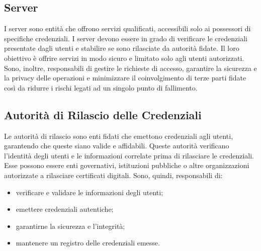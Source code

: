     \subsection{Server}
        I server sono entità che offrono servizi qualificati, accessibili solo ai possessori di specifiche credenziali.
        I server devono essere in grado di verificare le credenziali presentate dagli utenti e stabilire se sono rilasciate da autorità fidate.
        Il loro obiettivo è offrire servizi in modo sicuro e limitato solo agli utenti autorizzati.
        Sono, inoltre, responsabili di gestire le richieste di accesso, garantire la sicurezza e la privacy delle operazioni e minimizzare il coinvolgimento di terze parti fidate così da ridurre i rischi legati ad un singolo punto di fallimento.

        
    \subsection{Autorità di Rilascio delle Credenziali}
        Le autorità di rilascio sono enti fidati che emettono credenziali agli utenti, garantendo che queste siano valide e affidabili.
        Queste autorità verificano l'identità degli utenti e le informazioni correlate prima di rilasciare le credenziali.
        Esse possono essere enti governativi, istituzioni pubbliche o altre organizzazioni autorizzate a rilasciare certificati digitali.
        Sono, quindi, responsabili di:
            \begin{itemize}
                \item verificare e validare le informazioni degli utenti;

                \item emettere credenziali autentiche;

                \item garantirne la sicurezza e l'integrità;

                \item mantenere un registro delle credenziali emesse.
            \end{itemize}



